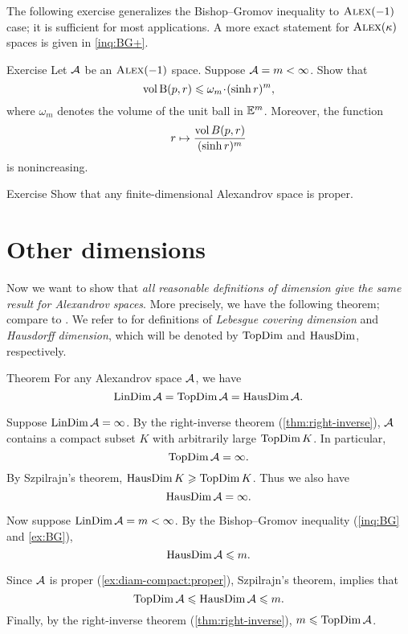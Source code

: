 The following exercise generalizes the Bishop--Gromov inequality to $\textsc{Alex}(-1)$ case;
it is sufficient for most applications.
A more exact statement for $\textsc{Alex}(\kappa)$ spaces is given in \ref{inq:BG+}.



\begin{thm}[!]{Exercise}\label{ex:BG}
Let $\mathcal{A}$ be an $\textsc{Alex}(-1)$ space.
Suppose $\mathcal{A}=m<\infty$.
Show that
\[\vol \oBall(p,r)\le \omega_m\cdot(\sinh r)^m,\]
where $\omega_m$ denotes the volume of the unit ball in $\mathbb{E}^m$.
Moreover, the function 
\[r\mapsto \frac{\operatorname{\rm vol}\nolimits B(p,r)}{(\sinh r)^m}\]
is nonincreasing.
\end{thm}

\begin{thm}[!]{Exercise}\label{ex:diam-compact:proper}
Show that any finite-dimensional Alexandrov space is proper.

\end{thm}
\section{Other dimensions}\label{sec:all-dim}

Now we want to show that \textit{all reasonable definitions of dimension give the same result for Alexandrov spaces}.
More precisely, we have the following theorem; compare to \cite[15.16]{alexander-kapovitch-petrunin2024}.
We refer to \cite{hurewicz-wallman} for definitions of \emph{Lebesgue covering dimension} and \emph{Hausdorff dimension}, which will be denoted by $\mathop{\rm TopDim}\nolimits$ and
$\mathop{\rm HausDim}\nolimits$, respectively.

\begin{thm}{Theorem}\label{thm:dim=dim}
For any Alexandrov space $\mathcal{A}$, we have
\[\mathop{\rm LinDim}\nolimits \mathcal{A}=\mathop{\rm TopDim}\nolimits \mathcal{A}=\mathop{\rm HausDim}\nolimits \mathcal{A}.\]
\end{thm}

Suppose $\mathop{\rm LinDim}\nolimits \mathcal{A}=\infty$.
By the right-inverse theorem (\ref{thm:right-inverse}), $\mathcal{A}$ contains a compact subset $K$ with  arbitrarily large $\mathop{\rm TopDim}\nolimits K$.
In particular,
\[\mathop{\rm TopDim}\nolimits\mathcal{A}=\infty.\] 
By Szpilrajn's theorem,
$\mathop{\rm HausDim}\nolimits K\geqslant \mathop{\rm TopDim}\nolimits K$.
Thus we also have 
\[\mathop{\rm HausDim}\nolimits\mathcal{A}=\infty.\]

Now suppose $\mathop{\rm LinDim}\nolimits \mathcal{A}=m<\infty$.
By the Bishop--Gromov inequality (\ref{inq:BG} and \ref{ex:BG}), 
\[\mathop{\rm HausDim}\nolimits\mathcal{A}\leqslant m.\]

Since $\mathcal{A}$ is proper (\ref{ex:diam-compact:proper}),
Szpilrajn's theorem, implies that
\[\mathop{\rm TopDim}\nolimits\mathcal{A}\leqslant \mathop{\rm HausDim}\nolimits\mathcal{A}\leqslant m.\]
Finally, by the right-inverse theorem (\ref{thm:right-inverse}), $m\leqslant\mathop{\rm TopDim}\nolimits\mathcal{A}$.
\qeds

